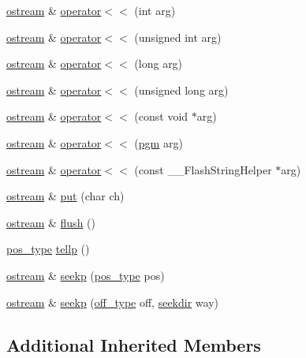 \begin{DoxyCompactItemize}
\item 
\hyperlink{classostream}{ostream} \& \hyperlink{classostream_ac3f6a9ba5ceac1ab83908b62a22678ce}{operator$<$$<$} (int arg)
\item 
\hyperlink{classostream}{ostream} \& \hyperlink{classostream_a11280fbc926632bfb12e269a85bc7a78}{operator$<$$<$} (unsigned int arg)
\item 
\hyperlink{classostream}{ostream} \& \hyperlink{classostream_ae6d3307287c7bf4e930055da4c9fd8de}{operator$<$$<$} (long arg)
\item 
\hyperlink{classostream}{ostream} \& \hyperlink{classostream_a13d3a6481cb20827e2e04f555a862dff}{operator$<$$<$} (unsigned long arg)
\item 
\hyperlink{classostream}{ostream} \& \hyperlink{classostream_a656ef553b6e90248e49ff019a7af3b6d}{operator$<$$<$} (const void $\ast$arg)
\item 
\hyperlink{classostream}{ostream} \& \hyperlink{classostream_a6a62b73e0122aa91a8311f5570b8c647}{operator$<$$<$} (\hyperlink{structpgm}{pgm} arg)
\item 
\hyperlink{classostream}{ostream} \& \hyperlink{classostream_a77f2c1cc6cafc88cde7d7d5baf88f586}{operator$<$$<$} (const \-\_\-\-\_\-\-Flash\-String\-Helper $\ast$arg)
\item 
\hyperlink{classostream}{ostream} \& \hyperlink{classostream_a579e0f645de6bbcc1c6b2881ffad086c}{put} (char ch)
\item 
\hyperlink{classostream}{ostream} \& \hyperlink{classostream_a10168396f7c85ce5033039f5ad5c7d1d}{flush} ()
\item 
\hyperlink{classios__base_a0833e9c1b028d7389a319a3dd11290d3}{pos\-\_\-type} \hyperlink{classostream_a3ae98dcca805c28cc310b04e75fed78e}{tellp} ()
\item 
\hyperlink{classostream}{ostream} \& \hyperlink{classostream_ab84f4756935a0279919abb5c17cd7bca}{seekp} (\hyperlink{classios__base_a0833e9c1b028d7389a319a3dd11290d3}{pos\-\_\-type} pos)
\item 
\hyperlink{classostream}{ostream} \& \hyperlink{classostream_aacaa5c2f24a01abc4f5243d620a40748}{seekp} (\hyperlink{classios__base_aa302457dd4c50f113d997fbf785a4bda}{off\-\_\-type} off, \hyperlink{classios__base_a5cca6e21eff1a334d30776a5a0f1c5e2}{seekdir} way)
\end{DoxyCompactItemize}
\subsection*{Additional Inherited Members}


